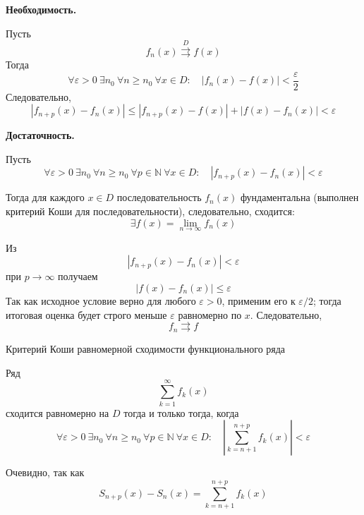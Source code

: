 \documentclass[12pt,a4paper]{article}
\begin{document}
\begin{proofbox}{}

    \textbf{Необходимость.}

    Пусть
    \[
        f_n(x)\overset{D}{\rightrightarrows}f(x)
    \]
    Тогда
    \[
        \forall\varepsilon>0\ \exists n_0\
        \forall n\geq n_0\
        \forall x\in D:
        \quad
        |f_n(x)-f(x)|<\frac{\varepsilon}{2}
    \]
    Следовательно,
    \[
        |f_{n+p}(x)-f_n(x)|
        \leq
        |f_{n+p}(x)-f(x)|
        +
        |f(x)-f_n(x)|
        <\varepsilon
    \]

    \textbf{Достаточность.}

    Пусть
    \[
        \forall\varepsilon>0\ \exists n_0\
        \forall n\geq n_0\
        \forall p\in\mathbb{N}\
        \forall x\in D:
        \quad
        |f_{n+p}(x)-f_n(x)|<\varepsilon
    \]

    Тогда для каждого $x\in D$ последовательность $f_n(x)$ фундаментальна (выполнен критерий Коши для последовательности), следовательно, сходится:
    \[
        \exists f(x)=\lim_{n\to\infty}f_n(x)
    \]

    Из
    \[
        |f_{n+p}(x)-f_n(x)|<\varepsilon
    \]
    при $p\to\infty$ получаем
    \[
        |f(x)-f_n(x)|\leq\varepsilon
    \]
    Так как исходное условие верно для любого $\varepsilon>0$, применим его к $\varepsilon/2$; тогда итоговая оценка будет строго меньше $\varepsilon$ равномерно по $x$. Следовательно,
    \[
        f_n\rightrightarrows f
    \]

\end{proofbox}

\begin{theorem}{Критерий Коши равномерной сходимости функционального ряда}

    Ряд
    \[
        \sum_{k=1}^{\infty}f_k(x)
    \]
    сходится равномерно на $D$ тогда и только тогда, когда
    \[
        \forall\varepsilon>0\ \exists n_0\
        \forall n\geq n_0\
        \forall p\in\mathbb{N}\
        \forall x\in D:
        \quad
        \left|
        \sum_{k=n+1}^{n+p}f_k(x)
        \right|<\varepsilon
    \]

\end{theorem}

\begin{proofbox}{}

    Очевидно, так как
    \[
        S_{n+p}(x)-S_n(x)
        =
        \sum_{k=n+1}^{n+p}f_k(x)
    \]

\end{proofbox}
\end{document}
